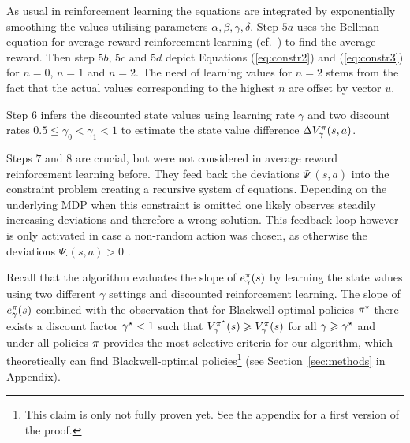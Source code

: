 \documentclass[envcountsame]{llncs}
\begin{document}
As usual in reinforcement learning the equations are integrated by exponentially smoothing the
values utilising parameters \(\alpha, \beta, \gamma, \delta\).
Step \(5a\) uses the Bellman equation for average reward reinforcement learning
(cf.~\citealt{Howard64, tadepalli1998model}) to find the average reward. Then step \(5b\), \(5c\)
and \(5d\) depict Equations (\ref{eq:constr2}) and (\ref{eq:constr3}) for \(n=0\), \(n=1\) and
\(n=2\). The need of learning values for \(n=2\) stems from the fact that the actual values
corresponding to the highest \(n\) are offset by vector \(u\).

Step \(6\) infers the discounted state values using learning rate \(\gamma\) and two discount rates
\(0.5 \leqslant \gamma_{0} < \gamma_{1} < 1\) to estimate the state value difference
\(\Delta V^{\pi}_{\gamma}(s,a)\).

Steps \(7\) and \(8\) are crucial, but were not considered in average reward reinforcement learning
before. They feed back the deviations \(\Psi_{\cdot}(s,a)\) into the constraint problem creating a
recursive system of equations. Depending on the underlying MDP when this constraint is omitted one
likely observes steadily increasing deviations and therefore a wrong solution. This feedback loop
however is only activated in case a non-random action was chosen, as otherwise the deviations
\(\Psi_{\cdot}(s,a) > 0\) \citep{MillerVeinott1969}.

%
%
%
Recall that the algorithm evaluates the slope of \(e_{\gamma}^{\pi}(s)\) by learning the state
values using two different \(\gamma\) settings and discounted reinforcement learning. The slope of
\(e_{\gamma}^{\pi}(s)\) combined with the observation that for Blackwell-optimal policies
\(\pi^{\star}\) there exists a discount factor \(\gamma^{\star} < 1\) such that
\(V_{\gamma}^{\pi^{\star}}(s) \geqslant V_{\gamma}^{\pi}(s)\) for all \(\gamma \geqslant \gamma^{\star}\)
and under all policies \(\pi\)
\citep{Mahadevan96_SensitiveDiscountOptimalityUnifyingDiscountedAndAverageRewardReinforcementLearning,Blackwell62}
provides the most selective criteria for our algorithm, which theoretically can find
Blackwell-optimal policies\footnote{This claim is only not fully proven yet. See the appendix for a
  first version of the proof. } (see Section~\ref{sec:methods} in Appendix).
\end{document}
